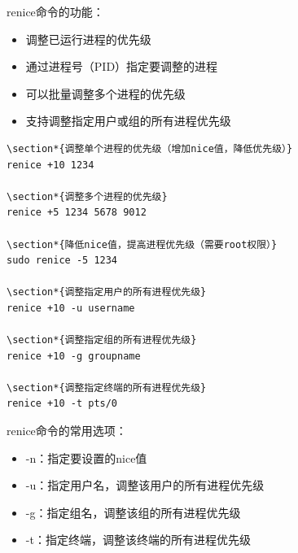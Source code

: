 \documentclass[12pt,UTF8]{ctexbook}
\begin{document}
renice命令的功能：
\begin{itemize}
    \item 调整已运行进程的优先级
    \item 通过进程号（PID）指定要调整的进程
    \item 可以批量调整多个进程的优先级
    \item 支持调整指定用户或组的所有进程优先级
\end{itemize}

\begin{verbatim}
\section*{调整单个进程的优先级（增加nice值，降低优先级）}
renice +10 1234

\section*{调整多个进程的优先级}
renice +5 1234 5678 9012

\section*{降低nice值，提高进程优先级（需要root权限）}
sudo renice -5 1234

\section*{调整指定用户的所有进程优先级}
renice +10 -u username

\section*{调整指定组的所有进程优先级}
renice +10 -g groupname

\section*{调整指定终端的所有进程优先级}
renice +10 -t pts/0
\end{verbatim}

renice命令的常用选项：
\begin{itemize}
    \item -n：指定要设置的nice值
    \item -u：指定用户名，调整该用户的所有进程优先级
    \item -g：指定组名，调整该组的所有进程优先级
    \item -t：指定终端，调整该终端的所有进程优先级
\end{itemize}
\end{document}
